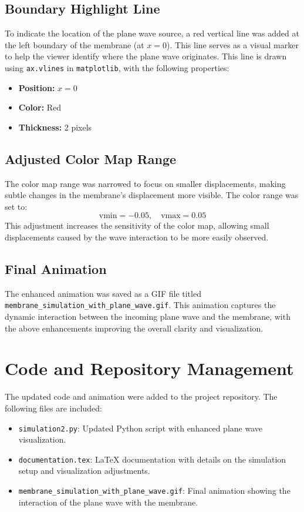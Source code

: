 \documentclass{article}
\begin{document}
\subsection{Boundary Highlight Line}
To indicate the location of the plane wave source, a red vertical line was added at the left boundary of the membrane (at $x = 0$). This line serves as a visual marker to help the viewer identify where the plane wave originates. This line is drawn using \texttt{ax.vlines} in \texttt{matplotlib}, with the following properties:
\begin{itemize}
    \item \textbf{Position:} $x = 0$
    \item \textbf{Color:} Red
    \item \textbf{Thickness:} 2 pixels
\end{itemize}

\subsection{Adjusted Color Map Range}
The color map range was narrowed to focus on smaller displacements, making subtle changes in the membrane’s displacement more visible. The color range was set to:
\[
\text{vmin} = -0.05, \quad \text{vmax} = 0.05
\]
This adjustment increases the sensitivity of the color map, allowing small displacements caused by the wave interaction to be more easily observed.

\subsection{Final Animation}
The enhanced animation was saved as a GIF file titled \texttt{membrane\_simulation\_with\_plane\_wave.gif}. This animation captures the dynamic interaction between the incoming plane wave and the membrane, with the above enhancements improving the overall clarity and visualization.

\section{Code and Repository Management}
The updated code and animation were added to the project repository. The following files are included:
\begin{itemize}
    \item \texttt{simulation2.py}: Updated Python script with enhanced plane wave visualization.
    \item \texttt{documentation.tex}: LaTeX documentation with details on the simulation setup and visualization adjustments.
    \item \texttt{membrane\_simulation\_with\_plane\_wave.gif}: Final animation showing the interaction of the plane wave with the membrane.
\end{itemize}
\end{document}
